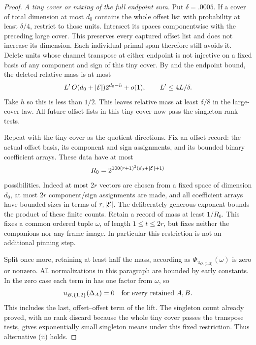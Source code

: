 \begin{proof}
\medskip\noindent
\emph{A tiny cover or mixing of the full endpoint sum.}
Put \(\delta=.0005\).  If a cover of total dimension at most
\(d_0\) contains the whole offset list with probability at least
\(\delta/4\), restrict to those units.  Intersect its spaces componentwise with the preceding large cover.
This preserves every captured offset list and does not increase its
dimension.  Each individual primal span therefore still avoids it.  Delete units whose channel transpose at either
endpoint is not injective on a fixed basis of any component and
sign of this tiny cover.  By  and the
endpoint bound, the deleted relative mass is at most
\[
 L'\,O(d_0+|\mathcal E|)2^{d_0-h}+o(1),
 \qquad L'\le 4L/\delta.
\]
Take \(h\) so this is less than \(1/2\).  This leaves relative mass
at least \(\delta/8\) in the large-cover law.  All future offset
lists in this tiny cover now pass the singleton rank tests.

Repeat  with the tiny cover as the quotient
directions.  Fix an offset record: the actual offset basis, its
component and sign assignments, and its bounded binary coefficient
arrays.  These data have at most
\[
 R_0=2^{100(r+1)^2(d_0+|\mathcal E|+1)}
\]
possibilities.  Indeed at most \(2r\) vectors are chosen from a
fixed space of dimension \(d_0\), at most \(2r\) component/sign
assignments are made, and all coefficient arrays have bounded
sizes in terms of \(r,|\mathcal E|\).  The deliberately generous exponent
bounds the product of these finite counts.  Retain a record of
mass at least \(1/R_0\).  This fixes a common ordered tuple
\(\omega\), of length \(1\le t\le2r\), but fixes neither the
companions nor any frame image.  In particular this restriction
is not an additional pinning step.

Split once more, retaining at least half the mass, according as
\(\Phi_{u_{O,\{1,2\}}}(\omega)\) is zero or nonzero.  All
normalizations in this paragraph are bounded by early constants.
In the zero case each term in  has one
factor from \(\omega\), so
\[
 u_{B,\{1,2\}}(\Delta_A)=0
 \quad\hbox{for every retained } A,B.
\]
This includes the last, offset--offset term of the lift.  The
singleton count already proved, with no rank discard because the
whole tiny cover passes the transpose tests, gives exponentially
small singleton means under this fixed restriction.  Thus
alternative \textup{(ii)} holds.


\end{proof}

